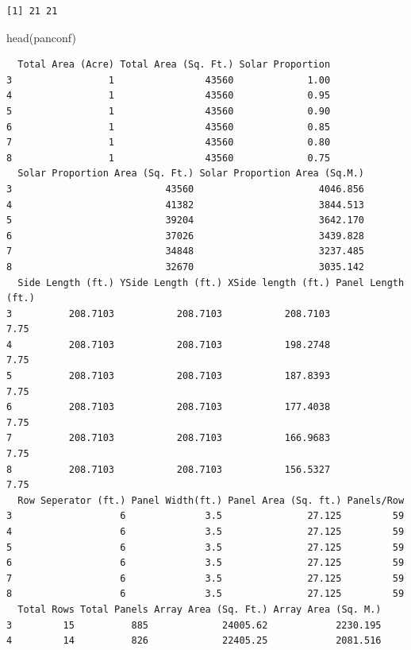 \documentclass[
  letterpaper,
  DIV=11,
  numbers=noendperiod]{scrartcl}
\newenvironment{Shaded}{\begin{snugshade}}{\end{snugshade}}
\newcommand{\FunctionTok}[1]{\textcolor[rgb]{0.28,0.35,0.67}{#1}}
\newcommand{\NormalTok}[1]{\textcolor[rgb]{0.00,0.23,0.31}{#1}}
\begin{document}
\begin{verbatim}
[1] 21 21
\end{verbatim}

\begin{Shaded}
\begin{Highlighting}[]
\FunctionTok{head}\NormalTok{(panconf)}
\end{Highlighting}
\end{Shaded}

\begin{verbatim}
  Total Area (Acre) Total Area (Sq. Ft.) Solar Proportion
3                 1                43560             1.00
4                 1                43560             0.95
5                 1                43560             0.90
6                 1                43560             0.85
7                 1                43560             0.80
8                 1                43560             0.75
  Solar Proportion Area (Sq. Ft.) Solar Proportion Area (Sq.M.)
3                           43560                      4046.856
4                           41382                      3844.513
5                           39204                      3642.170
6                           37026                      3439.828
7                           34848                      3237.485
8                           32670                      3035.142
  Side Length (ft.) YSide Length (ft.) XSide length (ft.) Panel Length (ft.)
3          208.7103           208.7103           208.7103               7.75
4          208.7103           208.7103           198.2748               7.75
5          208.7103           208.7103           187.8393               7.75
6          208.7103           208.7103           177.4038               7.75
7          208.7103           208.7103           166.9683               7.75
8          208.7103           208.7103           156.5327               7.75
  Row Seperator (ft.) Panel Width(ft.) Panel Area (Sq. ft.) Panels/Row
3                   6              3.5               27.125         59
4                   6              3.5               27.125         59
5                   6              3.5               27.125         59
6                   6              3.5               27.125         59
7                   6              3.5               27.125         59
8                   6              3.5               27.125         59
  Total Rows Total Panels Array Area (Sq. Ft.) Array Area (Sq. M.)
3         15          885             24005.62            2230.195
4         14          826             22405.25            2081.516

\end{verbatim}
\end{document}
